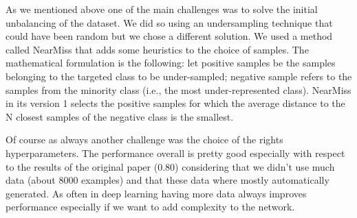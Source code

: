 \documentclass[a4paper, 9pt]{article}
\begin{document}
As we mentioned above one of the main challenges was to solve the initial unbalancing of the dataset. We did
so using an undersampling technique that could have been random but we chose a different solution. We used 
a method called NearMiss that adds some heuristics to the choice of samples. The mathematical formulation is
the following: let positive samples be the samples belonging to the targeted class to be under-sampled;
negative sample refers to the samples from the minority class (i.e., the most under-represented class).
NearMiss in its version 1 selects the positive samples for which the average distance to the N closest
samples of the negative class is the smallest.

Of course as always another challenge was the choice of the rights hyperparameters. The performance overall
is pretty good especially with respect to the results of the original paper (0.80) considering that we
didn't use much data (about 8000 examples) and that these data where mostly automatically generated.
As often in deep learning having more data always improves performance especially if we want to add 
complexity to the network.
\end{document}
